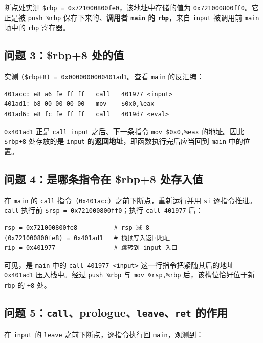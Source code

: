\documentclass[11pt,a4paper]{article}
\begin{document}
断点处实测 \texttt{\$rbp = 0x721000800fe0}，该地址中存储的值为 \texttt{0x721000800ff0}。它正是被 \texttt{push \%rbp} 保存下来的、\textbf{调用者 \texttt{main} 的 \texttt{rbp}}，来自 \texttt{input} 被调用前 \texttt{main} 帧中的 \texttt{rbp} 寄存器。

\subsection{问题 3：\$rbp+8 处的值}

实测 \texttt{(\$rbp+8) = 0x0000000000401ad1}。查看 \texttt{main} 的反汇编：

\begin{lstlisting}[language=myasm]
401acc: e8 a6 fe ff ff   call   401977 <input>
401ad1: b8 00 00 00 00   mov    $0x0,%eax
401ad6: e8 fc fe ff ff   call   4019d7 <eval>
\end{lstlisting}

\texttt{0x401ad1} 正是 \texttt{call input} 之后、下一条指令 \texttt{mov \$0x0,\%eax} 的地址。因此 \texttt{\$rbp+8} 处存放的是 \texttt{input} 的\textbf{返回地址}，即函数执行完后应当回到 \texttt{main} 中的位置。

\subsection{问题 4：是哪条指令在 \$rbp+8 处存入值}

在 \texttt{main} 的 \texttt{call} 指令（\texttt{0x401acc}）之前下断点，重新运行并用 \texttt{si} 逐指令推进。\texttt{call} 执行前 \texttt{\$rsp = 0x721000800ff0}；执行 \texttt{call 401977} 后：

\begin{lstlisting}
rsp = 0x721000800fe8          # rsp 减 8
(0x721000800fe8) = 0x401ad1   # 栈顶写入返回地址
rip = 0x401977                # 跳转到 input 入口
\end{lstlisting}

可见，是 \texttt{main} 中的 \texttt{call 401977 <input>} 这一行指令把紧随其后的地址 \texttt{0x401ad1} 压入栈中。经过 \texttt{push \%rbp} 与 \texttt{mov \%rsp,\%rbp} 后，该槽位恰好位于新 \texttt{rbp} 的 \texttt{+8} 处。

\subsection{问题 5：\texttt{call}、prologue、\texttt{leave}、\texttt{ret} 的作用}

在 \texttt{input} 的 \texttt{leave} 之前下断点，逐指令执行回 \texttt{main}，观测到：
\end{document}
